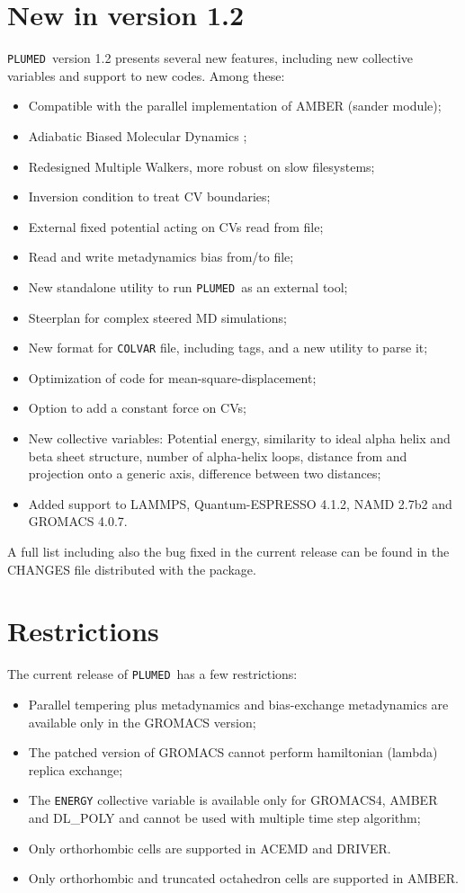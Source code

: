 \documentclass[12pt,fleqn]{report}
\newcommand{\keyword}[1]{\index{Keywords!{\tt #1}} {\tt #1}}
\newcommand{\plumed}{{\tt PLUMED}}
\begin{document}
\section{New in version 1.2}
\plumed  \ version  1.2 presents several new features, including new collective variables and 
support to new codes. Among these:
\begin{itemize}
\item Compatible with the parallel implementation of AMBER (sander module);
\item Adiabatic Biased Molecular Dynamics \cite{ballone};
\item Redesigned Multiple Walkers, more robust on slow filesystems;
\item Inversion condition to treat CV boundaries;
\item External fixed potential acting on CVs read from file;
\item Read and write metadynamics bias from/to file;
\item New standalone utility to run \plumed \ as an external tool;
\item Steerplan for complex steered MD simulations;
\item New format for {\tt COLVAR} file, including tags, and a new utility to parse it;
\item Optimization of code for mean-square-displacement;
\item Option to add a constant force on CVs;
\item New collective variables: Potential energy, similarity to ideal alpha helix and beta sheet structure,
number of alpha-helix loops, distance from and projection onto a generic axis, difference between two distances;
\item Added support to LAMMPS, Quantum-ESPRESSO 4.1.2, NAMD 2.7b2 and GROMACS 4.0.7.
\end{itemize}

A full list including also the bug fixed in the current release can be found in the CHANGES file 
distributed with the package.

\section{Restrictions}

The current release of \plumed \ has a few restrictions: 
\begin{itemize}
\item Parallel tempering plus metadynamics and bias-exchange metadynamics are
available only in the GROMACS version;
\item The patched version of GROMACS cannot perform hamiltonian (lambda) replica
      exchange;
\item The \keyword{ENERGY} collective variable is available only for GROMACS4, AMBER and DL\_POLY
and cannot be used with multiple time step algorithm;
\item Only orthorhombic cells are supported in ACEMD and DRIVER.
\item Only orthorhombic and truncated octahedron cells are supported in AMBER.

\end{itemize}
\end{document}
